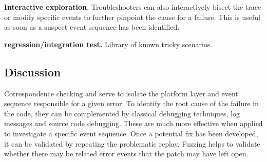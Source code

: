 \textbf{Interactive exploration.} Troubleshooters can also interactively bisect
the trace or modify specific events to further pinpoint the cause for a failure.
This is useful as soon as a suspect event sequence has been identified.

\textbf{regression/integration test.} Library of known tricky scenarios.

\subsection{Discussion}
Correspondence checking and \simulator{} serve to isolate the platform layer and
event sequence responsible for a given error. To identify the root cause of
the failure in the code, they can be complemented by classical debugging
techniques,\ie{} log messages and source code debugging. These are much more
effective when applied to investigate a specific event sequence. Once a
potential fix has been developed, it can be validated by repeating the
problematic replay. Fuzzing helps to validate whether there may be
related error events that the patch may have left open.

